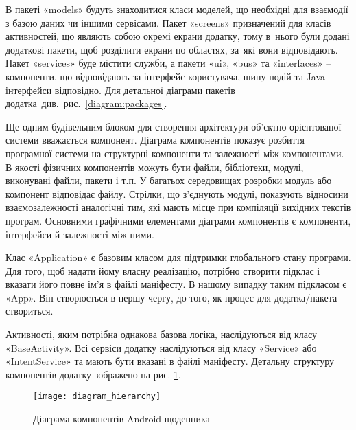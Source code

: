 \documentclass[../main.tex]{subfiles}
\begin{document}
В пакеті «models» будуть знаходитися класи моделей, що необхідні для взаємодії з базою даних чи іншими сервісами. Пакет «screens» призначений для класів активностей, що являють собою окремі екрани додатку, тому в~нього були додані додаткові пакети, щоб розділити екрани по областях, за~які вони відповідають. Пакет «services» буде містити служби, а пакети «ui», «bus» та «interfaces» -- компоненти, що відповідають за інтерфейс користувача, шину подій та Java інтерфейси відповідно. Для детальної діаграми пакетів додатка~див.~рис.~\ref{diagram:packages}.

Ще одним будівельним блоком для створення архітектури \mbox{об'єктно-орієнтованої} системи вважається компонент. Діаграма компонентів показує розбиття програмної системи на структурні компоненти та залежності між компонентами. В якості фізичних компонентів можуть бути файли, бібліотеки, модулі, виконувані файли, пакети і т.п. У багатьох середовищах розробки модуль або компонент відповідає файлу. Стрілки, що з'єднують модулі, показують відносини взаємозалежності аналогічні тим, які мають місце при компіляції вихідних текстів програм. Основними графічними елементами діаграми компонентів є компоненти, інтерфейси й залежності між ними. 

Клас «Application» є базовим класом для підтримки глобального стану програми. Для того, щоб надати йому власну реалізацію, потрібно створити підклас і вказати його повне ім'я в файлі маніфесту. В нашому випадку таким підкласом є «App». Він створюється в першу чергу, до того, як процес для додатка/пакета створиться.

Активності, яким потрібна однакова базова логіка, наслідуються від класу «BaseActivity». Всі сервіси додатку наслідуються від класу «Service» або «IntentService» та мають бути вказані в файлі маніфесту. Детальну структуру компонентів додатку зображено на рис. \ref{diagram:hierarchy}.

\begin{figure}[p]
	\centering
	\texttt{[image: diagram\_hierarchy]}
	\caption{Діаграма компонентів Android-щоденника}
	\label{diagram:hierarchy}
\end{figure}
\end{document}
